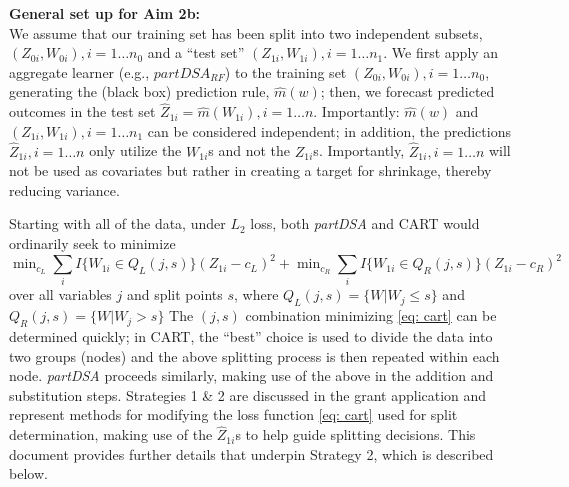 \documentclass[12pt]{article}
\begin{document}
{\bf General set up for Aim 2b:}\\

We assume that our training set has been split into two independent
subsets, $(Z_{0i},W_{0i}), i = 1 \ldots n_0$ and a ``test set''
$(Z_{1i}, W_{1i}), i = 1 \ldots n_1$. We first apply an aggregate
learner (e.g., $partDSA_{RF}$) to the training set $(Z_{0i}, W_{0i}),
i = 1 \ldots n_0$, generating the (black box) prediction rule,
$\hat{m}(w)$; then, we forecast predicted outcomes in the test set
$\widehat{Z}_{1i} = \hat{m}(W_{1i}), i = 1 \ldots n$.  Importantly:
$\hat{m}(w)$ and $(Z_{1i}, W_{1i}), i = 1 \ldots n_1$ can be
considered independent; in addition, the predictions
$\widehat{Z}_{1i}, i = 1 \ldots n$ only utilize the $W_{1i}$s and not
the $Z_{1i}$s. Importantly, $\widehat{Z}_{1i}, i = 1 \ldots n$ will
not be used as covariates but rather in creating a target for
shrinkage, thereby reducing variance.

Starting with all of the data, under $L_2$ loss,
both \emph{partDSA} and CART would ordinarily seek to minimize
\begin{equation} \label{eq: cart}
\min\nolimits_{c_L} {\textstyle \sum\nolimits}_i I\{ W_{1i} \in Q_{L}(j,s) \} (Z_{1i}-c_L)^2
+ \min\nolimits_{c_R} {\textstyle \sum\nolimits}_i
I\{ W_{1i} \in Q_{R}(j,s) \}
(Z_{1i}-c_R)^2
\end{equation}
over all variables $j$ and split points $s$,
where
$Q_{L}(j,s) = \{W|W_{j} \leq s\}$ and $Q_{R}(j,s) = \{W|W_{j} >
s\}$ 
The $(j,s)$ combination minimizing \eqref{eq: cart} can be determined
quickly; in CART, the ``best'' choice is used to divide the data into
two groups (nodes) and the above splitting process is then repeated
within each node. \emph{partDSA} proceeds similarly, making use of the
above in the addition and substitution steps.  Strategies 1 \& 2 are
discussed in the grant application and represent methods for modifying
the loss function \eqref{eq: cart} used for split determination,
making use of the $\widehat{Z}_{1i}$s to help guide splitting
decisions. This document provides further details that underpin
Strategy 2, which is described below.\\
\end{document}

